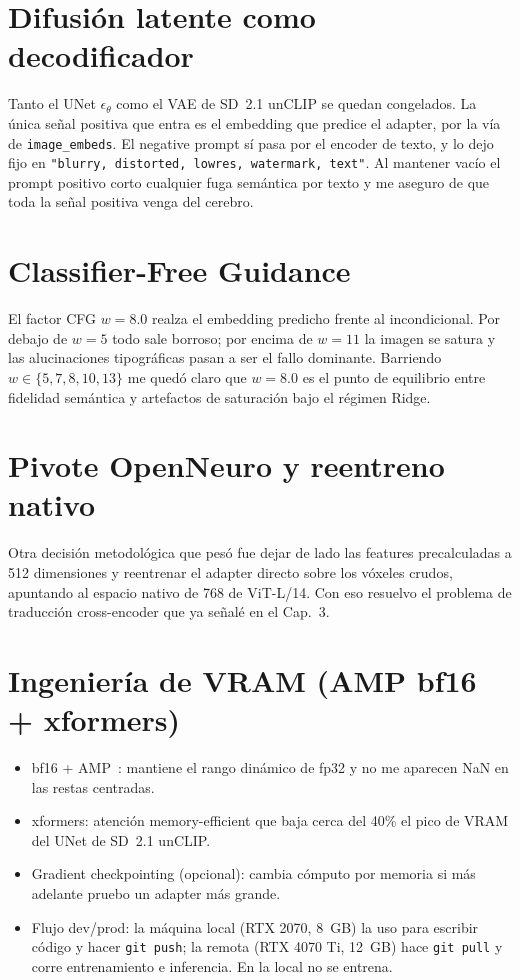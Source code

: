 \section{Difusión latente como decodificador}

Tanto el UNet $\epsilon_{\theta}$ como el VAE de SD~2.1 unCLIP se quedan congelados. La única señal positiva que entra es el embedding que predice el adapter, por la vía de \texttt{image\_embeds}. El negative prompt sí pasa por el encoder de texto, y lo dejo fijo en \texttt{"blurry, distorted, lowres, watermark, text"}. Al mantener vacío el prompt positivo corto cualquier fuga semántica por texto y me aseguro de que toda la señal positiva venga del cerebro.

\section{Classifier-Free Guidance}

El factor CFG $w=8.0$ realza el embedding predicho frente al incondicional. Por debajo de $w=5$ todo sale borroso; por encima de $w=11$ la imagen se satura y las alucinaciones tipográficas pasan a ser el fallo dominante. Barriendo $w\in\{5,7,8,10,13\}$ me quedó claro que $w=8.0$ es el punto de equilibrio entre fidelidad semántica y artefactos de saturación bajo el régimen Ridge.

\section{Pivote OpenNeuro y reentreno nativo}

Otra decisión metodológica que pesó fue dejar de lado las features precalculadas a 512 dimensiones y reentrenar el adapter directo sobre los vóxeles crudos, apuntando al espacio nativo de 768 de ViT-L/14. Con eso resuelvo el problema de traducción cross-encoder que ya señalé en el Cap.~3.

\section{Ingeniería de VRAM (AMP bf16 + xformers)}

\begin{itemize}
\item[•] bf16 + AMP~\cite{micikevicius2018amp,kobayashi2017bf16}: mantiene el rango dinámico de fp32 y no me aparecen NaN en las restas centradas.
\item[•] xformers: atención memory-efficient que baja cerca del 40\% el pico de VRAM del UNet de SD~2.1 unCLIP.
\item[•] Gradient checkpointing (opcional): cambia cómputo por memoria si más adelante pruebo un adapter más grande.
\item[•] Flujo dev/prod: la máquina local (RTX 2070, 8~GB) la uso para escribir código y hacer \texttt{git push}; la remota (RTX 4070 Ti, 12~GB) hace \texttt{git pull} y corre entrenamiento e inferencia. En la local no se entrena.
\end{itemize}

